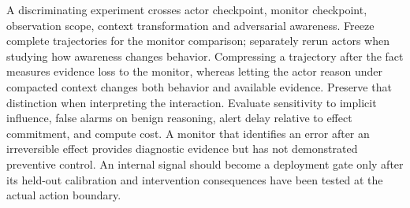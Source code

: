 A discriminating experiment crosses actor checkpoint, monitor checkpoint, observation scope, context transformation and adversarial awareness. Freeze complete trajectories for the monitor comparison; separately rerun actors when studying how awareness changes behavior. Compressing a trajectory after the fact measures evidence loss to the monitor, whereas letting the actor reason under compacted context changes both behavior and available evidence. Preserve that distinction when interpreting the interaction. Evaluate sensitivity to implicit influence, false alarms on benign reasoning, alert delay relative to effect commitment, and compute cost. A monitor that identifies an error after an irreversible effect provides diagnostic evidence but has not demonstrated preventive control. An internal signal should become a deployment gate only after its held-out calibration and intervention consequences have been tested at the actual action boundary.

